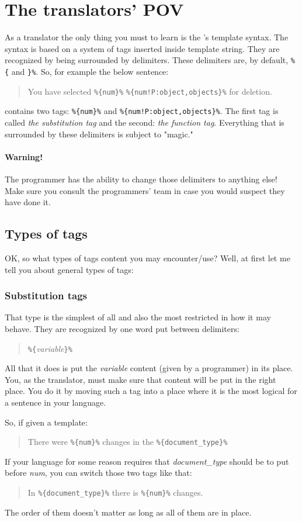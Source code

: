\section{The translators' POV}\label{transPOV}

As a translator the only thing you must to learn is the \mulan{}'s template syntax. 
The syntax is based on a system of tags inserted inside template string. They are recognized by being surrounded by delimiters.
These delimiters are, by default, \verb+%{+ and \verb+}%+. So, for example the below sentence:
\begin{quote}
	You have selected \verb+%{num}%+ \verb+%{num!P:object,objects}%+ for deletion.
\end{quote}
contains two tags: \verb+%{num}%+ and \verb+%{num!P:object,objects}%+. 
The first tag is called \emph{the substitution tag} and the second: \emph{the function tag}.
Everything that is surrounded by these delimiters is subject to \mulan{} "magic."

\paragraph{Warning!} The programmer has the ability to change those delimiters to anything else! Make sure you consult the programmers' team in case you would suspect they have done it.

\subsection{Types of tags}
OK, so what types of tags content you may encounter/use?
Well, at first let me tell you about general types of tags:
\subsubsection{Substitution tags}
That type is the simplest of all and also the most restricted in how it may behave. 
They are recognized by one word put between delimiters:
\begin{quote}
	\verb+%{+\textit{variable}\verb+}%+
\end{quote}
All that it does is put the \textit{variable} content (given by a programmer) in its place.
You, as the translator, must make sure that content will be put in the right place. You do it by moving such a tag into a place where it is the most logical for a sentence in your language.

So, if given a template:\begin{quote}
	There were \verb+%{num}%+ changes in the \verb+%{document_type}%+
\end{quote}
If your language for some reason requires that \textit{document\_type} should be to put before \textit{num}, you can switch those two tags like that:\begin{quote}
	In \verb+%{document_type}%+ there is \verb+%{num}%+ changes.
\end{quote}
 The order of them doesn't matter as long as all of them are in place.

